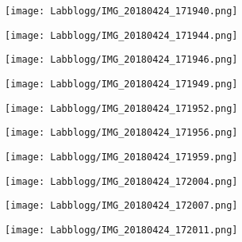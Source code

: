 \begin{figure}[H]
    \centering
    \texttt{[image: Labblogg/IMG\_20180424\_171940.png]}
    \caption*{}
    \label{fig:my_label}
\end{figure}

\begin{figure}[H]
    \centering
    \texttt{[image: Labblogg/IMG\_20180424\_171944.png]}
    \caption*{}
    \label{fig:my_label}
\end{figure}

\begin{figure}[H]
    \centering
    \texttt{[image: Labblogg/IMG\_20180424\_171946.png]}
    \caption*{}
    \label{fig:my_label}
\end{figure}

\begin{figure}[H]
    \centering
    \texttt{[image: Labblogg/IMG\_20180424\_171949.png]}
    \caption*{}
    \label{fig:my_label}
\end{figure}

\begin{figure}[H]
    \centering
    \texttt{[image: Labblogg/IMG\_20180424\_171952.png]}
    \caption*{}
    \label{fig:my_label}
\end{figure}

\begin{figure}[H]
    \centering
    \texttt{[image: Labblogg/IMG\_20180424\_171956.png]}
    \caption*{}
    \label{fig:my_label}
\end{figure}

\begin{figure}[H]
    \centering
    \texttt{[image: Labblogg/IMG\_20180424\_171959.png]}
    \caption*{}
    \label{fig:my_label}
\end{figure}

\begin{figure}[H]
    \centering
    \texttt{[image: Labblogg/IMG\_20180424\_172004.png]}
    \caption*{}
    \label{fig:my_label}
\end{figure}

\begin{figure}[H]
    \centering
    \texttt{[image: Labblogg/IMG\_20180424\_172007.png]}
    \caption*{}
    \label{fig:my_label}
\end{figure}

\begin{figure}[H]
    \centering
    \texttt{[image: Labblogg/IMG\_20180424\_172011.png]}
    \caption*{}
    \label{fig:my_label}
\end{figure}


